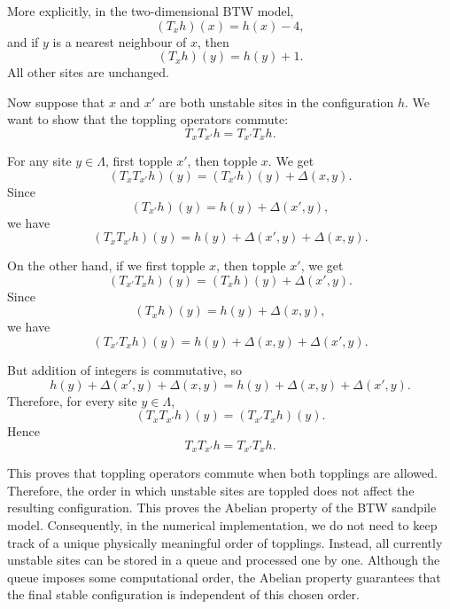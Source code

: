 More explicitly, in the two-dimensional BTW model,
\[
(T_xh)(x)=h(x)-4,
\]
and if \(y\) is a nearest neighbour of \(x\), then
\[
(T_xh)(y)=h(y)+1.
\]
All other sites are unchanged.

Now suppose that \(x\) and \(x'\) are both unstable sites in the configuration \(h\). We want
to show that the toppling operators commute:
\[
T_xT_{x'}h = T_{x'}T_xh.
\]

For any site \(y \in \Lambda\), first topple \(x'\), then topple \(x\). We get
\[
(T_xT_{x'}h)(y)
=
(T_{x'}h)(y)+\Delta(x,y).
\]
Since
\[
(T_{x'}h)(y)=h(y)+\Delta(x',y),
\]
we have
\[
(T_xT_{x'}h)(y)
=
h(y)+\Delta(x',y)+\Delta(x,y).
\]

On the other hand, if we first topple \(x\), then topple \(x'\), we get
\[
(T_{x'}T_xh)(y)
=
(T_xh)(y)+\Delta(x',y).
\]
Since
\[
(T_xh)(y)=h(y)+\Delta(x,y),
\]
we have
\[
(T_{x'}T_xh)(y)
=
h(y)+\Delta(x,y)+\Delta(x',y).
\]

But addition of integers is commutative, so
\[
h(y)+\Delta(x',y)+\Delta(x,y)
=
h(y)+\Delta(x,y)+\Delta(x',y).
\]
Therefore, for every site \(y \in \Lambda\),
\[
(T_xT_{x'}h)(y)
=
(T_{x'}T_xh)(y).
\]
Hence
\[
T_xT_{x'}h = T_{x'}T_xh.
\]

This proves that toppling operators commute when both topplings are allowed. Therefore,
the order in which unstable sites are toppled does not affect the resulting configuration.
This proves the Abelian property of the BTW sandpile model. Consequently, in the numerical implementation, we do not need to keep track of a unique physically meaningful order of topplings. Instead, all currently unstable sites can be stored in a queue and processed one by one. Although the queue imposes some computational order, the Abelian property guarantees that the final stable configuration is independent of this chosen order.